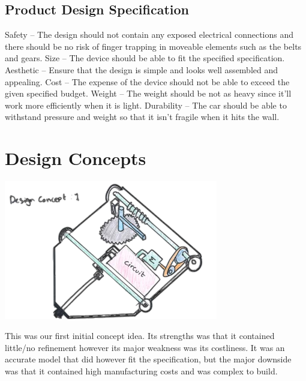 \documentclass{article}
\begin{document}
\subsection{Product Design Specification}
Safety – The design should not contain any exposed electrical connections and there should be no risk of finger trapping in moveable elements such as the belts and gears.
Size – The device should be able to fit the specified specification.
Aesthetic – Ensure that the design is simple and looks well assembled and appealing.
Cost – The expense of the device should not be able to exceed the given specified budget.
Weight – The weight should be not as heavy since it’ll work more efficiently when it is light.
Durability – The car should be able to withstand pressure and weight so that it isn’t fragile when it hits the wall.
\newpage\vspace*{-20pt}
\section{Design Concepts}
\begin{center}
	\includegraphics[width=0.7\textwidth]{images/image_6_2-Photoroom.png}
\end{center}\vspace{0.6em}\noindent
This was our first initial concept idea. Its strengths was that it contained little/no refinement however its major weakness was its costliness. It was an accurate model that did however fit the specification, but the major downside was that it contained high manufacturing costs and was complex to build.
\end{document}
